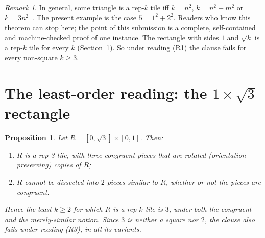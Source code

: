 \documentclass[11pt]{article}
\newtheorem{proposition}[theorem]{Proposition}
\theoremstyle{definition}
\theoremstyle{remark}
\newtheorem{remark}[theorem]{Remark}
\begin{document}
\begin{remark}
In general, some triangle is a rep-$k$ tile iff $k=n^2$, $k=n^2+m^2$ or $k=3n^2$~\cite{snover}.
The present example is the case $5=1^2+2^2$. Readers who know this theorem can stop here;
the point of this submission is a complete, self-contained and machine-checked proof of one
instance. The rectangle with sides $1$ and $\sqrt k$ is a rep-$k$ tile for every $k$
(Section~\ref{sec:least}). So under reading (R1) the clause fails for every non-square
$k\ge3$.
\end{remark}

\section{\texorpdfstring{The least-order reading: the $1\times\sqrt3$ rectangle}{The least-order reading: the 1 x sqrt3 rectangle}}\label{sec:least}

\begin{proposition}\label{prop:rect}
Let $R=[0,\sqrt3]\times[0,1]$. Then:
\begin{enumerate}
\item[(a)] $R$ is a rep-3 tile, with three congruent pieces that are rotated (orientation-preserving) copies of $R$;
\item[(b)] $R$ cannot be dissected into $2$ pieces similar to $R$, whether or not the pieces are congruent.
\end{enumerate}
Hence the least $k\ge2$ for which $R$ is a rep-$k$ tile is $3$, under both the congruent and the
merely-similar notion. Since $3$ is neither a square nor $2$, the clause also fails under
reading (R3), in all its variants.
\end{proposition}
\end{document}
